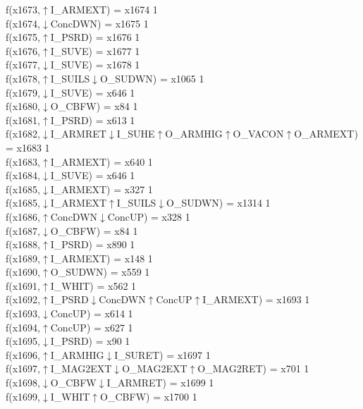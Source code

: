 f(x1673,$\uparrow$I\_ARMEXT) = x1674 {1} \\
f(x1674,$\downarrow$ConcDWN) = x1675 {1} \\
f(x1675,$\uparrow$I\_PSRD) = x1676 {1} \\
f(x1676,$\uparrow$I\_SUVE) = x1677 {1} \\
f(x1677,$\downarrow$I\_SUVE) = x1678 {1} \\
f(x1678,$\uparrow$I\_SUILS$\downarrow$O\_SUDWN) = x1065 {1} \\
f(x1679,$\downarrow$I\_SUVE) = x646 {1} \\
f(x1680,$\downarrow$O\_CBFW) = x84 {1} \\
f(x1681,$\uparrow$I\_PSRD) = x613 {1} \\
f(x1682,$\downarrow$I\_ARMRET$\downarrow$I\_SUHE$\uparrow$O\_ARMHIG$\uparrow$O\_VACON$\uparrow$O\_ARMEXT) = x1683 {1} \\
f(x1683,$\uparrow$I\_ARMEXT) = x640 {1} \\
f(x1684,$\downarrow$I\_SUVE) = x646 {1} \\
f(x1685,$\downarrow$I\_ARMEXT) = x327 {1} \\
f(x1685,$\downarrow$I\_ARMEXT$\uparrow$I\_SUILS$\downarrow$O\_SUDWN) = x1314 {1} \\
f(x1686,$\uparrow$ConcDWN$\downarrow$ConcUP) = x328 {1} \\
f(x1687,$\downarrow$O\_CBFW) = x84 {1} \\
f(x1688,$\uparrow$I\_PSRD) = x890 {1} \\
f(x1689,$\uparrow$I\_ARMEXT) = x148 {1} \\
f(x1690,$\uparrow$O\_SUDWN) = x559 {1} \\
f(x1691,$\uparrow$I\_WHIT) = x562 {1} \\
f(x1692,$\uparrow$I\_PSRD$\downarrow$ConcDWN$\uparrow$ConcUP$\uparrow$I\_ARMEXT) = x1693 {1} \\
f(x1693,$\downarrow$ConcUP) = x614 {1} \\
f(x1694,$\uparrow$ConcUP) = x627 {1} \\
f(x1695,$\downarrow$I\_PSRD) = x90 {1} \\
f(x1696,$\uparrow$I\_ARMHIG$\downarrow$I\_SURET) = x1697 {1} \\
f(x1697,$\uparrow$I\_MAG2EXT$\downarrow$O\_MAG2EXT$\uparrow$O\_MAG2RET) = x701 {1} \\
f(x1698,$\downarrow$O\_CBFW$\downarrow$I\_ARMRET) = x1699 {1} \\
f(x1699,$\downarrow$I\_WHIT$\uparrow$O\_CBFW) = x1700 {1} \\

